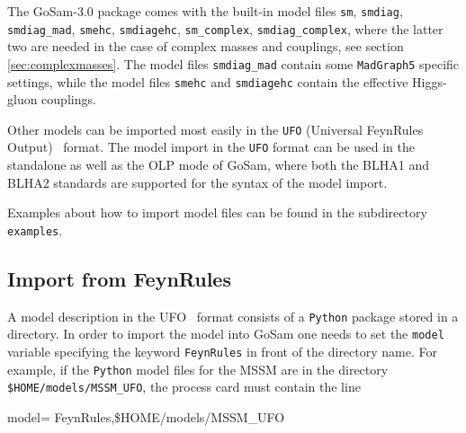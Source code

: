 \documentclass[11pt,a4paper]{refrep}
\newcommand{\gosamversion}{{3{.}0}}
\newcommand{\gosam}{{\sc GoSam}\xspace}
\begin{document}
The \gosam{}-\gosamversion{} package comes with the built-in model files 
{\tt sm}, {\tt smdiag}, {\tt smdiag\_mad}, {\tt smehc}, {\tt smdiagehc},
{\tt sm\_complex}, {\tt smdiag\_complex}, 
where the latter two are needed in the case of complex masses and couplings, 
see section \ref{sec:complexmasses}. 
The model files {\tt smdiag\_mad} contain some {\tt MadGraph5} specific settings, while
the model files {\tt smehc} and {\tt smdiagehc} contain the effective Higgs-gluon couplings.

Other models can be imported most easily in the {\tt UFO} (Universal FeynRules Output)~\cite{Degrande:2011ua} format.
The model import in the {\tt UFO} format can be used in the standalone as well as the OLP 
mode of \gosam, where both the BLHA1 and BLHA2 standards are supported for the syntax of the model import.

Examples about how to import model files can be found in the subdirectory 
 \texttt{examples}.

\subsection{Import from FeynRules}
A model description in the UFO~\cite{Degrande:2011ua} format consists of a \texttt{Python} package
stored in a directory. In order to import the model into \gosam{} one needs
to set the \texttt{model} variable specifying the keyword \texttt{FeynRules}
in front of the directory name.
For example, if the \texttt{Python} model files for the MSSM are in 
 the directory \\
 \texttt{\$HOME/models/MSSM\_UFO}, the process card must contain the line
\begin{example}
model= FeynRules,\$HOME/models/MSSM\_UFO
\end{example}
\end{document}
